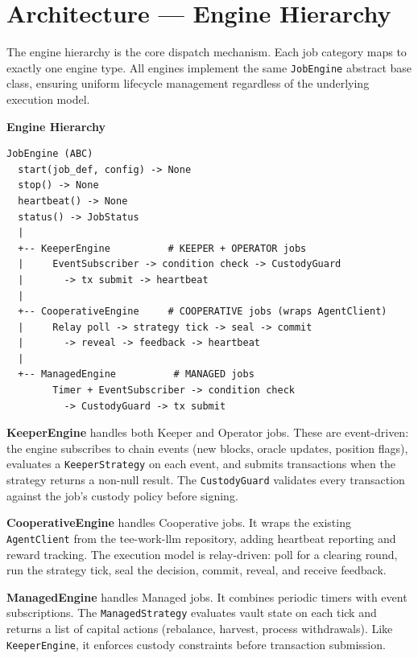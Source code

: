 \documentclass[11pt,a4paper]{article}
\begin{document}
\section{Architecture --- Engine Hierarchy}

The engine hierarchy is the core dispatch mechanism. Each job category maps to
exactly one engine type. All engines implement the same \texttt{JobEngine} abstract
base class, ensuring uniform lifecycle management regardless of the underlying
execution model.

\begin{contractbox}
\textbf{Engine Hierarchy}
\begin{lstlisting}[language={}]
JobEngine (ABC)
  start(job_def, config) -> None
  stop() -> None
  heartbeat() -> None
  status() -> JobStatus
  |
  +-- KeeperEngine          # KEEPER + OPERATOR jobs
  |     EventSubscriber -> condition check -> CustodyGuard
  |       -> tx submit -> heartbeat
  |
  +-- CooperativeEngine     # COOPERATIVE jobs (wraps AgentClient)
  |     Relay poll -> strategy tick -> seal -> commit
  |       -> reveal -> feedback -> heartbeat
  |
  +-- ManagedEngine          # MANAGED jobs
        Timer + EventSubscriber -> condition check
          -> CustodyGuard -> tx submit
\end{lstlisting}
\end{contractbox}

\textbf{KeeperEngine} handles both \textcolor{keeper}{Keeper} and
\textcolor{operator}{Operator} jobs. These are event-driven: the engine subscribes
to chain events (new blocks, oracle updates, position flags), evaluates a
\texttt{KeeperStrategy} on each event, and submits transactions when the strategy
returns a non-null result. The \texttt{CustodyGuard} validates every transaction
against the job's custody policy before signing.

\textbf{CooperativeEngine} handles \textcolor{cooperative}{Cooperative} jobs. It
wraps the existing \texttt{AgentClient} from the tee-work-llm repository, adding
heartbeat reporting and reward tracking. The execution model is relay-driven:
poll for a clearing round, run the strategy tick, seal the decision, commit, reveal,
and receive feedback.

\textbf{ManagedEngine} handles \textcolor{managed}{Managed} jobs. It combines
periodic timers with event subscriptions. The \texttt{ManagedStrategy} evaluates
vault state on each tick and returns a list of capital actions (rebalance, harvest,
process withdrawals). Like \texttt{KeeperEngine}, it enforces custody constraints
before transaction submission.
\end{document}
